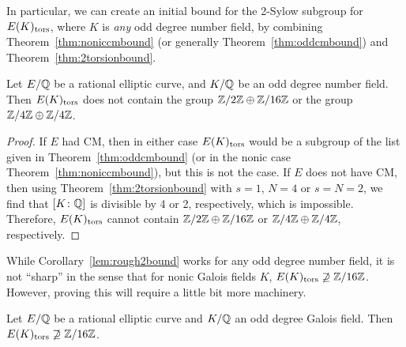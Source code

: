 In particular, we can create an initial bound for the 2-Sylow subgroup for $E(K)_{\text{tors}}$, where $K$ is \textit{any} odd degree number field, by combining Theorem~\ref{thm:noniccmbound} (or generally Theorem~\ref{thm:oddcmbound}) and Theorem~\ref{thm:2torsionbound}.


\begin{lem} \label{lem:rough2bound}
Let $E/\mathbb{Q}$ be a rational elliptic curve, and $K/\mathbb{Q}$ be an odd degree number field. Then $E(K)_{\text{tors}}$ does not contain the group $\mathbb{Z}/2\mathbb{Z} \oplus \mathbb{Z}/16\mathbb{Z}$ or the group $\mathbb{Z}/4\mathbb{Z} \oplus \mathbb{Z}/4\mathbb{Z}$. 
\end{lem}

\begin{proof} 
If $E$ had CM, then in either case $E(K)_{\text{tors}}$ would be a subgroup of the list given in Theorem~\ref{thm:oddcmbound} (or in the nonic case Theorem~\ref{thm:noniccmbound}), but this is not the case. If $E$ does not have CM, then using Theorem~\ref{thm:2torsionbound} with $s= 1$, $N= 4$ or $s= N= 2$, we find that $[K \colon \mathbb{Q}]$ is divisible by 4 or 2, respectively, which is impossible. Therefore, $E(K)_{\text{tors}}$ cannot contain $\mathbb{Z}/2\mathbb{Z} \oplus \mathbb{Z}/16\mathbb{Z}$ or $\mathbb{Z}/4\mathbb{Z} \oplus \mathbb{Z}/4\mathbb{Z}$, respectively. 
\end{proof}


While Corollary~\ref{lem:rough2bound} works for any odd degree number field, it is not ``sharp'' in the sense that for nonic Galois fields $K$, $E(K)_{\text{tors}} \not\supseteq \mathbb{Z}/16\mathbb{Z}$. However, proving this will require a little bit more machinery.  


\begin{lem} \label{lem:no16torsion}
Let $E/\mathbb{Q}$ be a rational elliptic curve and $K/\mathbb{Q}$ an odd degree Galois field. Then $E(K)_{\text{tors}} \not\supseteq \mathbb{Z}/16\mathbb{Z}$.
\end{lem}

